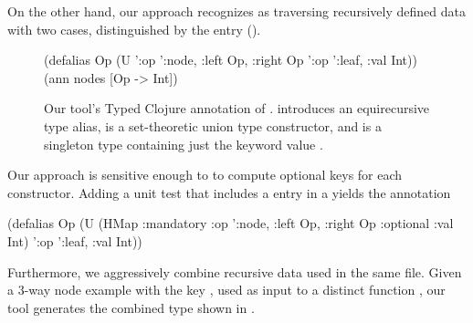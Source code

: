 %
%

On the other hand,
our approach recognizes  as traversing recursively defined
data with two cases, distinguished by the 
entry ().

\begin{figure}
\begin{cljlisting}
(defalias Op 
  (U '{:op ':node, :left Op, :right Op}
     '{:op ':leaf, :val Int}))
(ann nodes [Op -> Int])
\end{cljlisting}
  \caption{Our tool's Typed Clojure annotation of .
   introduces an equirecursive type alias,
   is a set-theoretic union type constructor,
  and  is a singleton type containing just the keyword value
  .
}
\label{fig:infer:nodestype}
\end{figure}

Our approach is sensitive enough to
to compute optional keys for each constructor.
Adding a unit test that includes a 
entry in a  yields the annotation
\begin{cljlisting}
(defalias Op 
  (U (HMap :mandatory
           {:op ':node, :left Op, :right Op}
           :optional {:val Int})
     '{:op ':leaf, :val Int}))
\end{cljlisting}

Furthermore, we aggressively combine recursive data used
in the same file.
Given a 3-way node example with the key ,
used as input to a distinct function ,
our tool generates the combined type shown in .

